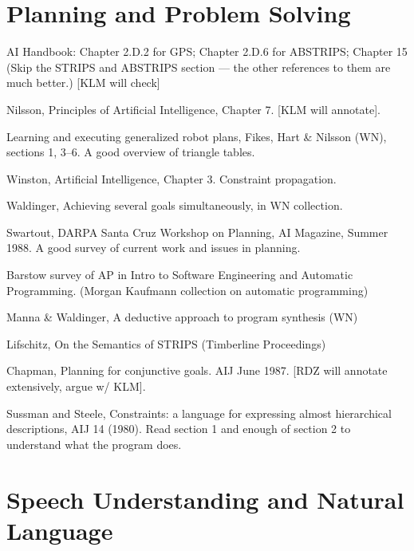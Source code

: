 \section{Planning and Problem Solving}
\label{sec:planning}

\begin{required}

\paper   AI Handbook:
     Chapter 2.D.2 for GPS;
     Chapter 2.D.6 for ABSTRIPS;
     Chapter 15 (Skip the STRIPS and ABSTRIPS section --- the other
references to them are much better.) [KLM will check]

\paper Nilsson, Principles of Artificial Intelligence, Chapter 7.
[KLM will annotate].

\paper Learning and executing generalized robot plans, Fikes, Hart \&
Nilsson (WN), sections 1, 3--6.  A good overview of triangle tables.

\paper Winston, Artificial Intelligence, Chapter 3.  Constraint
propagation.

\paper Waldinger, Achieving several goals simultaneously, in WN collection.

\paper   Swartout, DARPA Santa Cruz Workshop on Planning, AI Magazine,
Summer 1988.  A good survey of current work and issues in planning.

\paper   Barstow survey of AP in Intro to Software Engineering and Automatic
Programming. (Morgan Kaufmann collection on automatic programming)

\end{required}

\begin{optional}



 \paper   Manna \& Waldinger, A deductive approach to program synthesis  (WN)

 \paper   Lifschitz, On the Semantics of STRIPS (Timberline Proceedings)

 \paper Chapman, Planning for conjunctive goals.  AIJ June 1987.  [RDZ
will annotate extensively, argue w/ KLM].

 \paper Sussman and Steele, Constraints: a language for expressing
almost hierarchical descriptions, AIJ 14 (1980).  Read section 1 and
enough of section 2 to understand what the program does.

\end{optional}


\section{Speech Understanding and Natural Language}
\label{sec:speech}


